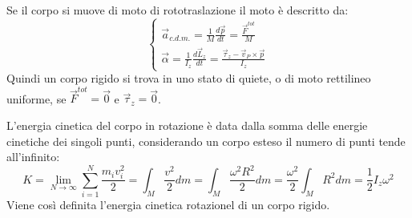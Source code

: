 \documentclass{article}
\numberwithin{equation}{subsection}
\begin{document}
Se il corpo si muove di moto di rototraslazione il moto è descritto da:
\begin{equation}
    \begin{cases}
        \vec{a}_{c.d.m.}=\displaystyle\frac{1}{M}\frac{d\vec{p}}{dt}=\frac{\vec{F}^{tot}}{M}\\
        \vec{\alpha}=\displaystyle\frac{1}{I_z}\frac{d\vec{L}_z}{dt}=\frac{\vec{\tau}_z-\vec{v}_P\times\vec{p}}{I_z}
    \end{cases}
\end{equation}
Quindi un corpo rigido si trova in uno stato di quiete, o di moto rettilineo uniforme, se $\vec{F}^{tot}=\vec{0}$ e $\vec{\tau}_z=\vec{0}$. 





L'energia cinetica del corpo in rotazione è data dalla somma delle energie 
cinetiche dei singoli punti, considerando un corpo esteso il 
numero di punti tende all'infinito:
\begin{equation}
    K=\displaystyle\lim_{N\to\infty}\sum_{i=1}^{N}\frac{m_iv_i^2}{2}=\int_M\frac{v^2}{2}dm=\int_M\frac{\omega^2R^2}{2}dm=\frac{\omega^2}{2}\int_M R^2dm=\frac{1}{2}I_z\omega^2
\end{equation}
Viene così definita l'energia cinetica rotazionel di un corpo rigido. 
\end{document}
